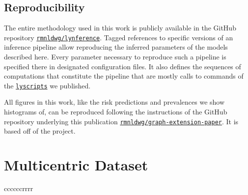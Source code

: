 \documentclass[twocolumn]{aastex631}
\begin{document}
\subsection{Reproducibility}
\label{subsec:complete_model:reproducibility}

The entire methodology used in this work is publicly available in the GitHub repository \href{https://github.com/rmnldwg/lynference}{\texttt{rmnldwg/lynference}}. Tagged references to specific versions of an inference pipeline allow reproducing the inferred parameters of the models described here. Every parameter necessary to reproduce such a pipeline is specified there in designated configuration files. It also defines the sequences of computations that constitute the pipeline that are mostly calls to commands of the \href{https://pypi.org/project/lyscripts/}{\texttt{lyscripts}} we published.

All figures in this work, like the risk predictions and prevalences we show histograms of, can be reproduced following the instructions of the GitHub repository underlying this publication \href{https://github.com/rmnldwg/graph-extension-paper}{\texttt{rmnldwg/graph-extension-paper}}. It is based off of the \showyourwork project.



\section{Multicentric Dataset}
\label{sec:data}

\begin{deluxetable}{ccccccrrrr}
    \startdata
    \enddata
\end{deluxetable}
\end{document}
